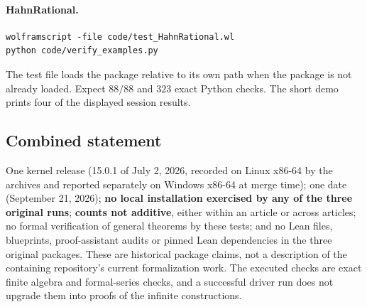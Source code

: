 \documentclass[11pt,letterpaper]{article}
\numberwithin{equation}{section}
\theoremstyle{definition}
\theoremstyle{remark}
\begin{document}
\paragraph{HahnRational.}
\begin{lstlisting}
wolframscript -file code/test_HahnRational.wl
python code/verify_examples.py
\end{lstlisting}
The test file loads the package relative to its own path when the package is not
already loaded. Expect $88/88$ and $323$ exact Python checks. The short demo
 prints four of the displayed session results.

\subsection{Combined statement}
\label{cas:app-combined}
One kernel release (15.0.1 of July 2, 2026, recorded on Linux x86-64 by the
archives and reported separately on Windows x86-64 at merge time); one date
(September 21, 2026);
\textbf{no local installation exercised by any of the three original runs};
\textbf{counts not additive}, either within an article or across articles; no
formal verification of general theorems by these tests; and no Lean files,
blueprints, proof-assistant audits or pinned Lean dependencies in the three
original packages. These are historical package claims, not a description of
the containing repository's current formalization work. The
executed checks are exact finite algebra and formal-series checks, and a
successful driver run does not upgrade them into proofs of the infinite
constructions.
\end{document}
